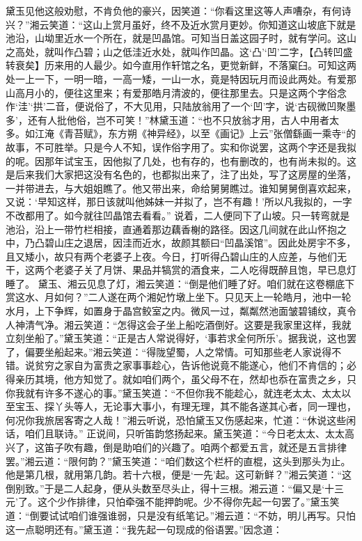 \documentclass[12pt,oneside]{book}
\begin{document}
黛玉见他这般劝慰，不肯负他的豪兴，因笑道：“你看这里这等人声嘈杂，有何诗兴？”湘云笑道：“这山上赏月虽好，终不及近水赏月更妙。你知道这山坡底下就是池沿，山坳里近水一个所在，就是凹晶馆。可知当日盖这园子时，就有学问。这山之高处，就叫作凸碧；山之低洼近水处，就叫作凹晶。这‘凸’‘凹’二字，【凸转凹盛转衰矣】历来用的人最少。如今直用作轩馆之名，更觉新鲜，不落窠臼。可知这两处一上一下，一明一暗，一高一矮，一山一水，竟是特因玩月而设此两处。有爱那山高月小的，便往这里来；有爱那皓月清波的，便往那里去。只是这两个字俗念作‘洼’‘拱’二音，便说俗了，不大见用，只陆放翁用了一个‘凹’字，说‘古砚微凹聚墨多’，还有人批他俗，岂不可笑！”林黛玉道：“也不只放翁才用，古人中用者太多。如江淹《青苔赋》，东方朔《神异经》，以至《画记》上云”张僧繇画一乘寺“的故事，不可胜举。只是今人不知，误作俗字用了。实和你说罢，这两个字还是我拟的呢。因那年试宝玉，因他拟了几处，也有存的，也有删改的，也有尚未拟的。这是后来我们大家把这没有名色的，也都拟出来了，注了出处，写了这房屋的坐落，一并带进去，与大姐姐瞧了。他又带出来，命给舅舅瞧过。谁知舅舅倒喜欢起来，又说：‘早知这样，那日该就叫他姊妹一并拟了，岂不有趣！’所以凡我拟的，一字不改都用了。如今就往凹晶馆去看看。”
说着，二人便同下了山坡。只一转弯就是池沿，沿上一带竹栏相接，直通着那边藕香榭的路径。因这几间就在此山怀抱之中，乃凸碧山庄之退居，因洼而近水，故颜其额曰“凹晶溪馆”。因此处房宇不多，且又矮小，故只有两个老婆子上夜。今日，打听得凸碧山庄的人应差，与他们无干，这两个老婆子关了月饼、果品并犒赏的酒食来，二人吃得既醉且饱，早已息灯睡了。
黛玉、湘云见息了灯，湘云笑道：“倒是他们睡了好。咱们就在这卷棚底下赏这水、月如何？”二人遂在两个湘妃竹墩上坐下。只见天上一轮皓月，池中一轮水月，上下争辉，如置身于晶宫鲛室之内。微风一过，粼粼然池面皱碧铺纹，真令人神清气净。湘云笑道：“怎得这会子坐上船吃酒倒好。这要是我家里这样，我就立刻坐船了。”黛玉笑道：“正是古人常说得好，‘事若求全何所乐’。据我说，这也罢了，偏要坐船起来。”湘云笑道：“得陇望蜀，人之常情。可知那些老人家说得不错。说贫穷之家自为富贵之家事事趁心，告诉他说竟不能遂心，他们不肯信的；必得亲历其境，他方知觉了。就如咱们两个，虽父母不在，然却也忝在富贵之乡，只你我就有许多不遂心的事。”黛玉笑道：“不但你我不能趁心，就连老太太、太太以至宝玉、探丫头等人，无论事大事小，有理无理，其不能各遂其心者，同一理也，何况你我旅居客寄之人哉！”湘云听说，恐怕黛玉又伤感起来，忙道：“休说这些闲话，咱们且联诗。”
正说间，只听笛韵悠扬起来。黛玉笑道：“今日老太太、太太高兴了，这笛子吹有趣，倒是助咱们的兴趣了。咱两个都爱五言，就还是五言排律罢。”湘云道：“限何韵？”黛玉笑道：“咱们数这个栏杆的直棍，这头到那头为止。他是第几根，就用第几韵。若十六根，便是‘一先’起。这可新鲜？”湘云笑道：“这倒别致。”于是二人起身，便从头数至尽头止，得十三根。湘云道：“偏又是‘十三元’了。这个少作排律，只怕牵强不能押韵呢。少不得你先起一句罢了。”黛玉笑道：“倒要试试咱们谁强谁弱，只是没有纸笔记。”湘云道：“不妨，明儿再写。只怕这一点聪明还有。”黛玉道：“我先起一句现成的俗语罢。”因念道：
\end{document}
